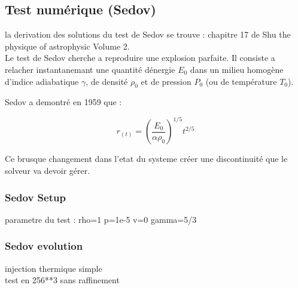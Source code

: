 \subsection{Test numérique (Sedov)}

la derivation des solutions du test de Sedov se trouve :
chapitre 17 de Shu the physique of astrophysic Volume 2.\\

Le test de Sedov cherche a reproduire une explosion parfaite.
Il consiste a relacher instantanemant une quantité dénergie $E_0$ dans un milieu homogène d'indice adiabatique $\gamma$, de densité $\rho_0$ et de pression $P_0$ (ou de température $T_0$).

Sedov a demontré en 1959 que :

\begin{equation}
r_{(t)}=\left( \frac{E_0}{\alpha \rho_0 }\right)^{1/5} t^{2/5}
\end{equation}



Ce brusque changement dans l'etat du systeme créer une discontinuité que le solveur va devoir gérer.


\subsubsection{Sedov Setup}

parametre du test :
rho=1
p=1e-5
v=0
gamma=5/3

\subsubsection{Sedov evolution}

injection thermique simple\\
test en 256**3 sans raffinement\\

